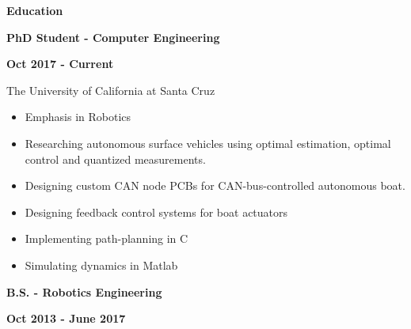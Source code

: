 \documentclass[paper=a4,fontsize=11pt]{article} %
\def \sectionSpace      {0.5cm}     %
\def \subSectionSpace   {0.1cm}     %
\def \leftColSpace      {0.12}      %
\def \middleColSpace    {0.675}     %
\def \bigMiddleColSpace {0.875}     %
\def \rightColSpace     {0.25}      %
\begin{document}
\vspace{\sectionSpace}
\noindent
\begin{minipage}[t]{\leftColSpace\linewidth}
    \begin{flushleft}
        \noindent \textbf{Education}\\
    \end{flushleft}
\end{minipage}
\begin{minipage}[t]{\middleColSpace\linewidth}
    \noindent \textbf{PhD Student - Computer Engineering}
\end{minipage}
\begin{minipage}[t]{\rightColSpace\linewidth}
    \begin{flushleft}
        \noindent \textbf{Oct 2017 - Current}
    \end{flushleft}
\end{minipage}
\begin{minipage}[t]{\leftColSpace\linewidth}
    \hfill
\end{minipage}
\begin{minipage}[t]{\bigMiddleColSpace\linewidth}
    \noindent The University of California at Santa Cruz
    \begin{itemize}[noitemsep,topsep=0pt]
        \item Emphasis in Robotics
        \item Researching autonomous surface vehicles using optimal estimation, optimal control and quantized measurements.
        \item Designing custom CAN node PCBs for CAN-bus-controlled autonomous boat.
        \item Designing feedback control systems for boat actuators
        \item Implementing path-planning in C
        \item Simulating dynamics in Matlab
    \end{itemize}
\end{minipage}
\noindent
\begin{minipage}[t]{\leftColSpace\linewidth}
    \hfill
\end{minipage}
\begin{minipage}[t]{\middleColSpace\linewidth}
    \begin{flushleft}
        \vspace{\subSectionSpace}
        \noindent \textbf{B.S. - Robotics Engineering}
    \end{flushleft}
\end{minipage}
\begin{minipage}[t]{\rightColSpace\linewidth}
    \begin{flushleft}
        \vspace{\subSectionSpace}
        \noindent \textbf{Oct 2013 - June 2017}
    \end{flushleft}
\end{minipage}
\end{document}
